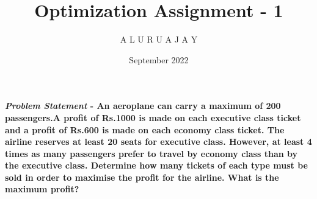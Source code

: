 \documentclass[10pt,twocolumn]{article}
\title{\textbf{Optimization Assignment - 1}}
\author{A L U R U A J A Y}
\date{September 2022}
\begin{document}
\maketitle
\paragraph{\textit{Problem Statement} -
\fi
An aeroplane can carry a maximum of 200 passengers.A profit of Rs.1000 is made on each executive class ticket and a profit of Rs.600 is made on each economy class ticket. The airline reserves at least 20 seats for executive class. However, at least 4 times as many passengers prefer to travel by economy class than by the executive class. Determine how many tickets of each type must be sold in order to maximise the profit for the airline. What is the maximum profit? 
\\
\solution
\iffalse
}
\end{document}
